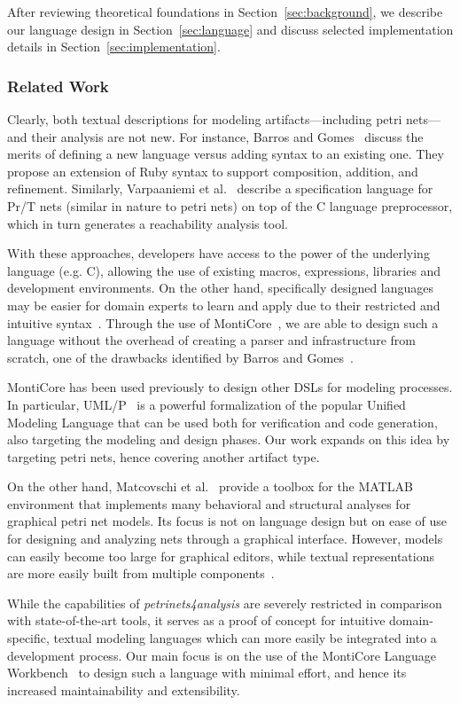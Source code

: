 After reviewing theoretical foundations in Section~\ref{sec:background}, we describe our language design in Section~\ref{sec:language} and discuss selected implementation details in Section~\ref{sec:implementation}.

\subsubsection{Related Work}

Clearly, both textual descriptions for modeling artifacts---including petri nets---and their analysis are not new. For instance, Barros and Gomes~\cite{barros2007use} discuss the merits of defining a new language versus adding syntax to an existing one. They propose an extension of Ruby syntax to support composition, addition, and refinement. Similarly, Varpaaniemi et al.~\cite{varpaaniemi1995prod} describe a specification language for Pr/T nets (similar in nature to petri nets) on top of the C language preprocessor, which in turn generates a reachability analysis tool.

With these approaches, developers have access to the power of the underlying language (e.g. C), allowing the use of existing macros, expressions, libraries and development environments. On the other hand, specifically designed languages may be easier for domain experts to learn and apply due to their restricted and intuitive syntax~\cite{karsai2014design}. Through the use of MontiCore~\cite{rumpe2017monticore}, we are able to design such a language without the overhead of creating a parser and infrastructure from scratch, one of the drawbacks identified by Barros and Gomes~\cite{barros2007use}.

MontiCore has been used previously to design other DSLs for modeling processes. In particular, UML/P~\cite{schindler2012werkzeuginfrastruktur} is a powerful formalization of the popular Unified Modeling Language that can be used both for verification and code generation, also targeting the modeling and design phases. Our work expands on this idea by targeting petri nets, hence covering another artifact type.

On the other hand, Matcovschi et al.~\cite{matcovschi2003petri} provide a toolbox for the MATLAB environment that implements many behavioral and structural analyses for graphical petri net models. Its focus is not on language design but on ease of use for designing and analyzing nets through a graphical interface. However, models can easily become too large for graphical editors, while textual representations are more easily built from multiple components~\cite{barros2007use}.

While the capabilities of \emph{petrinets4analysis} are severely restricted in comparison with state-of-the-art tools, it serves as a proof of concept for intuitive domain-specific, textual modeling languages which can more easily be integrated into a development process. Our main focus is on the use of the MontiCore Language Workbench~\cite{rumpe2017monticore} to design such a language with minimal effort, and hence its increased maintainability and extensibility.
